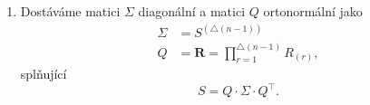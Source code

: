 \documentclass[czech]{article}
\renewcommand\tilde\widetilde
\begin{document}
\begin{enumerate}[label=(\roman*)]
\begin{enumerate}[label=(\alph*)]
\[\begin{pNiceMatrix}
				             & \Vdots &        &   &        & \Vdots             &        &        & \Ddots &        &        & \Vdots              &        &   &        &        & \\
				             &        &        &   &        &                    &        &        &        & 1      &        &                     &        &   &        &        & \\
				             &        &        &   &        &                    &        &        &        &        & \Ddots &                     &        &   &        &        & \\
				             &        &        &   &        & \sin(\theta^{(r)}) &        & \Cdots &        & \Cdots &        & \cos(\theta^{(r)})  &        &   &        &        & \\
				             &        &        &   &        &                    &        &        &        &        &        &                     & \Ddots &   &        &        & \\
				             &        &        &   &        &                    &        &        &        &        &        &                     &        & 1 &        &        & \\
				             &        &        &   &        &                    &        &        &        &        &        &                     &        &   & \Ddots &        & \\
				             & 0      & \Cdots &   &        &                    &        &        &        &        &        &                     &        &   &        & 1      & \\
			            \end{pNiceMatrix}.
		            \]
		      \item
		            \[
			            \mathscr{I}_{r}: \tilde{S}^{(r-1)} \mapsto \tilde{S}^{(r)} = R_{(r)}^{\top}\cdot \tilde{S}^{(r-1)} \cdot R_{(r)}.
		            \]
	      \end{enumerate}
	\item Dostáváme matici $\Sigma$ diagonální a matici $Q$ ortonormální jako
	      \begin{align*}
		      \Sigma & = S^{\left(\triangle(n-1)\right)}                        \\
		      Q      & = \boldsymbol{R} = \prod_{r=1}^{\triangle(n-1)} R_{(r)},
	      \end{align*}
	      splňující
	      \[
		      S = Q\cdot\Sigma\cdot Q^{\top}
		      .\]
\end{enumerate}
\end{document}
